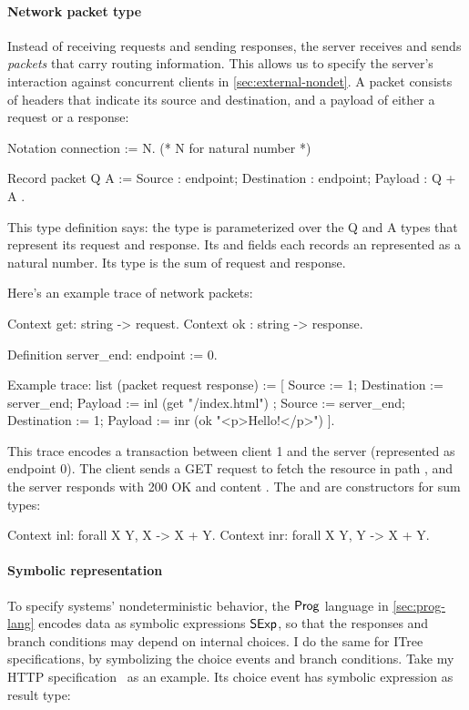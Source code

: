 \paragraph{Network packet type}
Instead of receiving requests and sending responses, the server receives and
sends {\em packets} that carry routing information.  This allows us to specify
the server's interaction against concurrent clients in
\autoref{sec:external-nondet}.  A packet consists of headers that indicate its
source and destination, and a payload of either a request or a response:
\begin{coq}
  Notation connection := N. (* N for natural number *)

  Record packet Q A := {
    Source      : endpoint;
    Destination : endpoint;
    Payload     : Q + A
  }.
\end{coq}
This type definition says: the  type is parameterized over the \ilc
Q and \ilc A types that represent its request and response.  Its 
and  fields each records an  represented as a
natural number.  Its  type is the sum of request and response.

Here's an example trace of network packets:
\begin{coq}
  Context get: string -> request.
  Context ok : string -> response.

  Definition server_end: endpoint := 0.

  Example trace: list (packet request response) :=
    [ { Source      := 1;
        Destination := server_end;
        Payload     := inl (get "/index.html")
      }
    ; { Source      := server_end;
        Destination := 1;
        Payload     := inr (ok "<p>Hello!</p>")
      }
    ].
\end{coq}
This trace encodes a transaction between client 1 and the server (represented as
endpoint 0).  The client sends a GET request to fetch the resource in path
, and the server responds with 200 OK and content
.  The  and  are constructors for sum
types:
\begin{coq}
  Context inl: forall {X Y}, X -> X + Y.
  Context inr: forall {X Y}, Y -> X + Y.
\end{coq}

\paragraph{Symbolic representation}
To specify systems' nondeterministic behavior, the $\mathsf{Prog}$ language in
\autoref{sec:prog-lang} encodes data as symbolic expressions $\mathsf{SExp}$, so that
the responses and branch conditions may depend on internal choices.  I do the
same for ITree specifications, by symbolizing the choice events and branch
conditions.  Take my HTTP specification~\cite{issta21} as an example.  Its
choice event has symbolic expression as result type:


